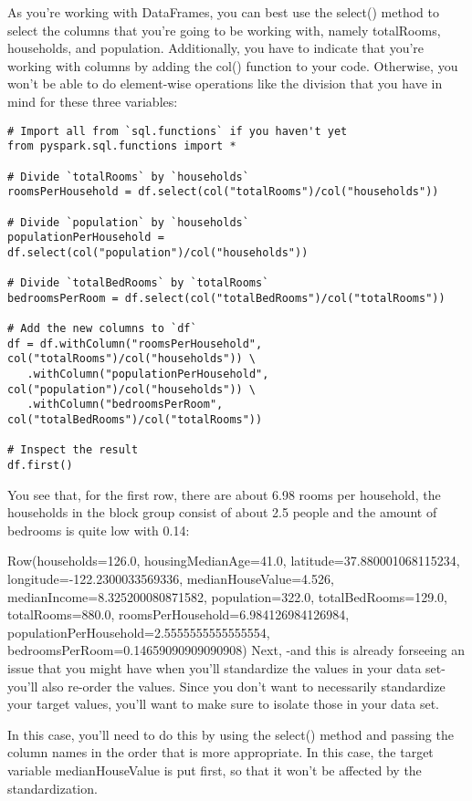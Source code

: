 \documentclass[a4paper,12pt]{article}
\begin{document}
As you’re working with DataFrames, you can best use the select() method to select the columns that you’re going to be working with, namely totalRooms, households, and population. Additionally, you have to indicate that you’re working with columns by adding the col() function to your code. Otherwise, you won’t be able to do element-wise operations like the division that you have in mind for these three variables:
\begin{verbatim}
# Import all from `sql.functions` if you haven't yet
from pyspark.sql.functions import *

# Divide `totalRooms` by `households`
roomsPerHousehold = df.select(col("totalRooms")/col("households"))

# Divide `population` by `households`
populationPerHousehold = df.select(col("population")/col("households"))

# Divide `totalBedRooms` by `totalRooms`
bedroomsPerRoom = df.select(col("totalBedRooms")/col("totalRooms"))

# Add the new columns to `df`
df = df.withColumn("roomsPerHousehold", col("totalRooms")/col("households")) \
   .withColumn("populationPerHousehold", col("population")/col("households")) \
   .withColumn("bedroomsPerRoom", col("totalBedRooms")/col("totalRooms"))
   
# Inspect the result
df.first()    
\end{verbatim}

You see that, for the first row, there are about 6.98 rooms per household, the households in the block group consist of about 2.5 people and the amount of bedrooms is quite low with 0.14:

Row(households=126.0, housingMedianAge=41.0, latitude=37.880001068115234, longitude=-122.2300033569336, medianHouseValue=4.526, medianIncome=8.325200080871582, population=322.0, totalBedRooms=129.0, totalRooms=880.0, roomsPerHousehold=6.984126984126984, populationPerHousehold=2.5555555555555554, bedroomsPerRoom=0.14659090909090908)
Next, -and this is already forseeing an issue that you might have when you’ll standardize the values in your data set- you’ll also re-order the values. Since you don’t want to necessarily standardize your target values, you’ll want to make sure to isolate those in your data set.

In this case, you’ll need to do this by using the select() method and passing the column names in the order that is more appropriate. In this case, the target variable medianHouseValue is put first, so that it won’t be affected by the standardization.
\end{document}
